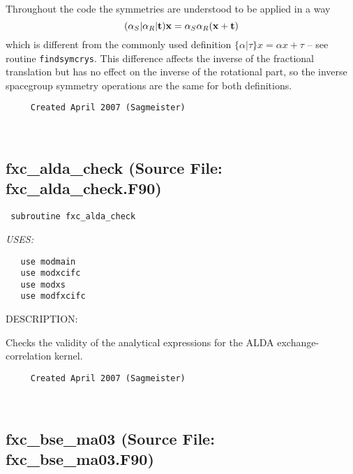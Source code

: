 \documentclass[11pt]{article}
\begin{document}
     Throughout the code the symmetries are understood to be applied in a way 
     $$ (\alpha_S|\alpha_R|{\bf t}) {\bf x} = \alpha_S\alpha_R
     ({\bf x}+{\bf t})$$
     which is different from the commonly used definition
     $\{\alpha|\tau\}x=\alpha x+\tau$ -- see routine {\tt findsymcrys}.
     This difference affects the inverse of the fractional translation
     but has no effect on the inverse of the rotational part, so the inverse
     spacegroup symmetry operations are the same for both definitions.
  
\begin{verbatim}     Created April 2007 (Sagmeister)\end{verbatim}




 
 
\mbox{}\hrulefill\ 
 
\subsection{fxc\_alda\_check (Source File: fxc\_alda\_check.F90)}


\begin{verbatim} subroutine fxc_alda_check\end{verbatim}{\em USES:}
\begin{verbatim}   use modmain
   use modxcifc
   use modxs
   use modfxcifc\end{verbatim}
{\sf DESCRIPTION:\\ }


     Checks the validity of the analytical expressions for the ALDA
     exchange-correlation kernel.
  
\begin{verbatim}     Created April 2007 (Sagmeister)\end{verbatim}


 
 
\mbox{}\hrulefill\ 
 
\subsection{fxc\_bse\_ma03 (Source File: fxc\_bse\_ma03.F90)}
\end{document}
